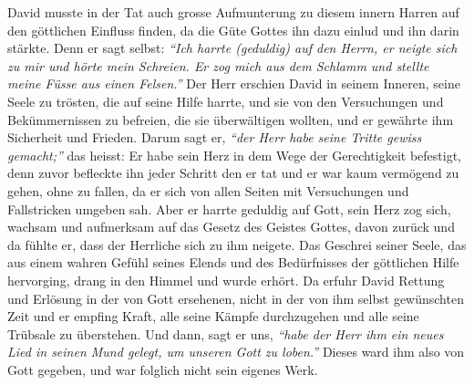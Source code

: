 David musste in der Tat auch grosse Aufmunterung zu
diesem innern Harren
auf den göttlichen Einfluss finden, da die Güte Gottes ihn dazu einlud und ihn
darin stärkte. Denn er sagt selbst:
\textit{"`Ich harrte (geduldig) auf den Herrn,
er neigte sich zu mir und hörte mein Schreien. Er zog mich aus dem Schlamm und
stellte meine Füsse aus einen Felsen."'}
Der Herr
erschien David in seinem Inneren, seine Seele zu trösten, die auf
seine Hilfe
harrte, und sie von den Versuchungen und Bekümmernissen zu befreien, die sie
überwältigen wollten, und er gewährte ihm Sicherheit und Frieden. Darum sagt er,
\textit{"`der Herr habe seine Tritte gewiss gemacht;"'}
das heisst: Er habe sein Herz in
dem Wege der Gerechtigkeit befestigt, denn zuvor befleckte ihn jeder Schritt den
er tat und er war kaum vermögend zu gehen, ohne zu fallen, da er sich von
allen Seiten mit Versuchungen und Fallstricken umgeben sah. Aber er harrte
geduldig auf Gott, sein Herz zog sich, wachsam und aufmerksam auf das Gesetz des
Geistes Gottes, davon zurück und da fühlte er, dass der Herrliche sich zu ihm
neigete. Das Geschrei seiner Seele, das aus einem
wahren Gefühl seines Elends
und des Bedürfnisses der göttlichen Hilfe hervorging, drang in den Himmel und
wurde erhört. Da erfuhr David Rettung und Erlösung in der von Gott ersehenen,
nicht in der von ihm selbst gewünschten Zeit und er empfing Kraft, alle seine
Kämpfe durchzugehen und alle seine Trübsale zu überstehen. Und dann, sagt er
uns,
\textit{"`habe der Herr ihm ein neues Lied in seinen Mund gelegt, um unseren
Gott zu loben."'}
Dieses ward ihm also von Gott gegeben, und war
folglich nicht sein eigenes Werk.

\medskip

